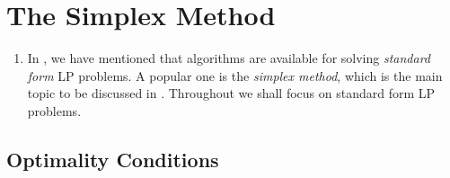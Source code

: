\section{The Simplex Method}
\label{sect:simplex-method}
\begin{enumerate}
\item In , we have mentioned that algorithms
are available for solving \emph{standard form} LP problems. A popular one is
the \emph{simplex method}, which is the main topic to be discussed in
. Throughout we shall focus on standard form LP
problems.
\end{enumerate}
\subsection{Optimality Conditions}
